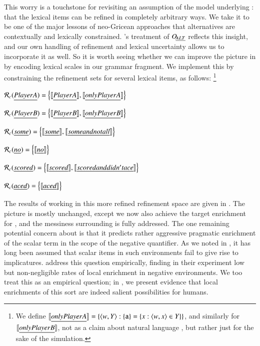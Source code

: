 \documentclass[leqno,12pt]{article}
\begin{document}
This worry is a touchstone for revisiting an
assumption of the model underlying : that the lexical
items can be refined in completely arbitrary ways. We take it to be one of the
major lessons of neo-Gricean approaches that alternatives are
contextually and lexically constrained. \CFS's treatment of $\mathop{O\negthinspace_{\emph{ALT}}}$
reflects this insight, and our own handling of refinement and lexical
uncertainty allows us to incorporate it as well. So it is worth seeing
whether we can improve the picture in  by
encoding lexical scales in our grammar fragment.  We
implement this by constraining the refinement sets for
several lexical items, as follows:%
\footnote{We define $\llbracket\emph{only Player A}\rrbracket = \left\{ \langle w, Y \rangle : \left\{ \texttt{a} \right\} = \left\{ x : \langle w,x \rangle \in Y \right\} \right\}$,
  and similarly for $\llbracket\emph{only Player B}\rrbracket$, not as a claim about natural language , but rather just 
  for the sake of the simulation.}
%
\begin{examples}
\item\label{neo}
  \begin{examples}
  \item $\mathcal{R}_{c}(\emph{Player A}) = \left\{ \llbracket\emph{Player A}\rrbracket, \llbracket\emph{only Player A}\rrbracket \right\}$
  \item $\mathcal{R}_{c}(\emph{Player B}) = \left\{ \llbracket\emph{Player B}\rrbracket, \llbracket\emph{only Player B}\rrbracket \right\}$
  \item $\mathcal{R}_{c}(\emph{some}) = \left\{ \llbracket\emph{some}\rrbracket, \llbracket\emph{some and not all}\rrbracket \right\}$
  \item $\mathcal{R}_{c}(\emph{no}) = \left\{ \llbracket\emph{no}\rrbracket \right\}$    
  \item $\mathcal{R}_{c}(\emph{scored}) = \left\{ \llbracket\emph{scored}\rrbracket, \llbracket\emph{scored and didn't ace}\rrbracket \right\}$
  \item $\mathcal{R}_{c}(\emph{aced}) = \left\{ \llbracket\emph{aced}\rrbracket \right\}$
  \end{examples}
\end{examples}
%
The results of working in this more refined refinement space are given
in . The picture is mostly unchanged,
except we now also achieve the target enrichment for , and the messiness surrounding  is
fully addressed. The one remaining potential concern about
 is that it predicts rather aggressive
pragmatic enrichment of the scalar term in the scope of the negative
quantifier. As we noted in , it has long been
assumed that scalar items in such environments fail to give rise to
implicatures. \citet{Chemla:Spector:2011} address this question
empirically, finding in their experiment low but non-negligible rates
of local enrichment in negative environments. We too treat this as an
empirical question; in , we present evidence that
local enrichments of this sort are indeed salient possibilities for
humans.
\end{document}
